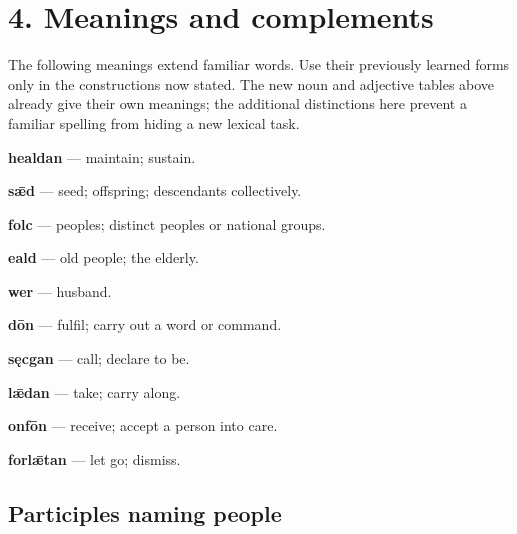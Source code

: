 \section*{4. Meanings and complements}

The following meanings extend familiar words. Use their previously learned forms only in the constructions now stated. The new noun and adjective tables above already give their own meanings; the additional distinctions here prevent a familiar spelling from hiding a new lexical task.

\textbf{healdan} — maintain; sustain.

\textbf{sǣd} — seed; offspring; descendants collectively.

\textbf{folc} — peoples; distinct peoples or national groups.

\textbf{eald} — old people; the elderly.

\textbf{wer} — husband.

\textbf{dōn} — fulfil; carry out a word or command.

\textbf{sęcgan} — call; declare to be.

\textbf{lǣdan} — take; carry along.

\textbf{onfōn} — receive; accept a person into care.

\textbf{forlǣtan} — let go; dismiss.

\subsection*{Participles naming people}

